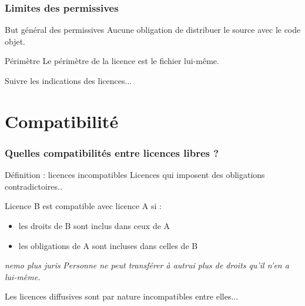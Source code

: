 \documentclass{beamer}
\begin{document}
\begin{frame}\frametitle{Limites des permissives}

  \begin{block}{But général des permissives}
    Aucune obligation de distribuer le source avec le code objet.
  \end{block}

  \begin{alertblock}{Périmètre}
    Le périmètre de la licence est le fichier lui-même.
  \end{alertblock}

  Suivre les indications des licences...

\end{frame}



\section{Compatibilité}


\begin{frame}\frametitle{Quelles compatibilités entre licences libres ?}

  \begin{block}{Définition : licences incompatibles}
    Licences qui imposent des obligations contradictoires..
  \end{block}

  \begin{alertblock}{Licence B est compatible avec licence A si :}
    \begin{itemize}
    \item les droits de B sont inclus dans ceux de A
    \item les obligations de A sont incluses dans celles de B
    \end{itemize}
  \end{alertblock}

  \pause

\begin{alertblock}{\textit{nemo plus juris}}
  \textit{Personne ne peut transférer à autrui plus de droits qu'il
    n'en a lui-même.}
\end{alertblock}

Les licences diffusives sont par nature incompatibles entre elles...

\end{frame}
\end{document}
